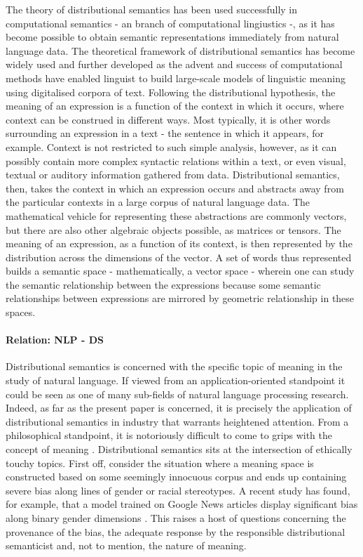 \documentclass{article}
\begin{document}
The theory of distributional semantics has been used successfully in computational semantics - an branch of computational lingiustics -, as it has become possible to obtain semantic representations immediately from natural language data. The theoretical framework of distributional semantics has become widely used and further developed as the advent and success of computational methods have enabled linguist to build large-scale models of linguistic meaning using digitalised corpora of text. 
Following the distributional hypothesis, the meaning of an expression is a function of the context in which it occurs, where context can be construed in different ways. Most typically, it is other words surrounding an expression in a text - the sentence in which it appears, for example. Context is not restricted to such simple analysis, however, as it can possibly contain more complex syntactic relations within a text, or even visual, textual or auditory information gathered from data.
\cite{boleda2016formal}
Distributional semantics, then, takes the context in which an expression occurs and abstracts away from the particular contexts in a large corpus of natural language data. The mathematical vehicle for representing these abstractions are commonly vectors, but there are also other algebraic objects possible, as matrices or tensors. The meaning of an expression, as a function of its context, is then represented by the distribution across the dimensions of the vector. A set of words thus represented builds a semantic space - mathematically, a vector space - wherein one can study the semantic relationship between the expressions because some semantic relationships between expressions are mirrored by geometric relationship in these spaces.

\paragraph{Relation: NLP - DS}
Distributional semantics is concerned with the specific topic of meaning in the study of natural language. If viewed from an application-oriented standpoint it could be seen as one of many sub-fields of natural language processing research. Indeed, as far as the present paper is concerned, it is precisely the application of distributional semantics in industry that warrants heightened attention.
From a philosophical standpoint, it is notoriously difficult to come to grips with the concept of meaning .
Distributional semantics sits at the intersection of ethically touchy topics. 
First off, consider the situation where a meaning space is constructed based on some seemingly innocuous corpus and ends up containing severe bias along lines of gender or racial stereotypes. A recent study has found, for example, that a model trained on Google News articles display significant bias along binary gender dimensions \cite{bolukbasi2016man}. This raises a host of questions concerning the provenance of the bias, the adequate response by the responsible distributional semanticist and, not to mention, the nature of meaning.
\end{document}
